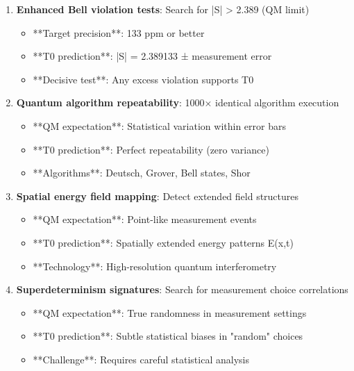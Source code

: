 \documentclass[12pt,a4paper]{article}
\begin{document}
	\begin{enumerate}
		\item \textbf{Enhanced Bell violation tests}: Search for |S| > 2.389 (QM limit)
		\begin{itemize}
			\item **Target precision**: 133 ppm or better
			\item **T0 prediction**: |S| = 2.389133 ± measurement error
			\item **Decisive test**: Any excess violation supports T0
		\end{itemize}
		
		\item \textbf{Quantum algorithm repeatability}: 1000× identical algorithm execution
		\begin{itemize}
			\item **QM expectation**: Statistical variation within error bars
			\item **T0 prediction**: Perfect repeatability (zero variance)
			\item **Algorithms**: Deutsch, Grover, Bell states, Shor
		\end{itemize}
		
		\item \textbf{Spatial energy field mapping}: Detect extended field structures
		\begin{itemize}
			\item **QM expectation**: Point-like measurement events
			\item **T0 prediction**: Spatially extended energy patterns E(x,t)
			\item **Technology**: High-resolution quantum interferometry
		\end{itemize}
		
		\item \textbf{Superdeterminism signatures}: Search for measurement choice correlations
		\begin{itemize}
			\item **QM expectation**: True randomness in measurement settings
			\item **T0 prediction**: Subtle statistical biases in "random" choices
			\item **Challenge**: Requires careful statistical analysis
		\end{itemize}
	\end{enumerate}
	
\end{document}

